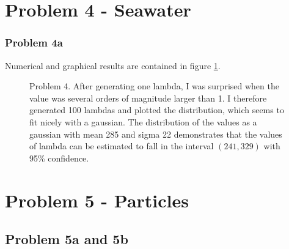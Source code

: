 \documentclass[a4paper,11pt]{article}
\begin{document}
\section{Problem 4 - Seawater}
\subsubsection{Problem 4a}
Numerical and graphical results are contained in figure \ref{p4_seawater}.


\begin{figure}[H]
  \centering
  \caption{Problem 4.
  After generating one lambda, I was surprised when the value was several orders of magnitude larger than 1.
  I therefore generated 100 lambdas and plotted the distribution, which seems to fit nicely with a gaussian.
The distribution of the values as a gaussian with mean 285 and sigma 22 demonstrates that the values of lambda can be estimated to fall in the interval $(241, 329)$ with 95\% confidence. }
  \label{p4_seawater}
\end{figure}

\section{Problem 5 - Particles}
\subsection{Problem 5a and 5b}
\end{document}
